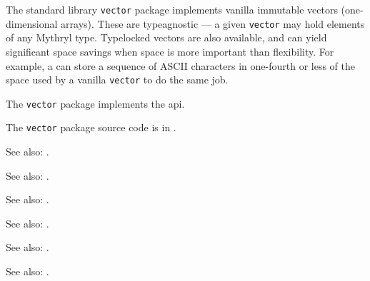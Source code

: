 
The standard library {\tt vector} package implements vanilla immutable vectors (one-dimensional arrays). 
These are typeagnostic --- a given {\tt vector} may hold elements of any Mythryl type.  Typelocked 
vectors are also available, and can yield significant space savings when space is more important than 
flexibility.  For example, a  can store a sequence of 
{\sc ASCII} characters in one-fourth or less of the space used by a vanilla {\tt vector} to do the 
same job.

The {\tt vector} package implements the  api.

The {\tt vector} package source code is in .

See also:  .

See also:  .

See also:  .

See also:  .

See also:  .

See also:  .






